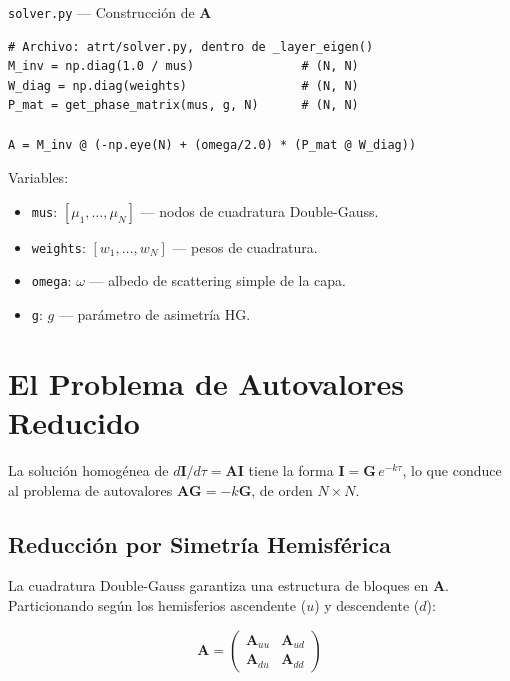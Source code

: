 \documentclass[a4paper,11pt]{article}
\begin{document}
\begin{implementation}{\texttt{solver.py} --- Construcci\'on de $\mathbf{A}$}
\begin{lstlisting}
# Archivo: atrt/solver.py, dentro de _layer_eigen()
M_inv = np.diag(1.0 / mus)               # (N, N)
W_diag = np.diag(weights)                # (N, N)
P_mat = get_phase_matrix(mus, g, N)      # (N, N)

A = M_inv @ (-np.eye(N) + (omega/2.0) * (P_mat @ W_diag))
\end{lstlisting}
Variables:
\begin{itemize}
\item \texttt{mus}: $[\mu_1, \ldots, \mu_N]$ --- nodos de cuadratura Double-Gauss.
\item \texttt{weights}: $[w_1, \ldots, w_N]$ --- pesos de cuadratura.
\item \texttt{omega}: $\omega$ --- albedo de scattering simple de la capa.
\item \texttt{g}: $g$ --- par\'ametro de asimetr\'ia HG.
\end{itemize}
\end{implementation}

\section{El Problema de Autovalores Reducido}
\label{sec:eigenvalue}

La soluci\'on homog\'enea de $d\mathbf{I}/d\tau = \mathbf{A}\mathbf{I}$ tiene la forma $\mathbf{I} = \mathbf{G} \, e^{-k\tau}$, lo que conduce al problema de autovalores $\mathbf{A}\mathbf{G} = -k\mathbf{G}$, de orden $N \times N$.

\subsection{Reducci\'on por Simetr\'ia Hemisf\'erica}

La cuadratura Double-Gauss garantiza una estructura de bloques en $\mathbf{A}$. Particionando seg\'un los hemisferios ascendente ($u$) y descendente ($d$):

\begin{equation}
\mathbf{A} = \begin{pmatrix} \mathbf{A}_{uu} & \mathbf{A}_{ud} \\ \mathbf{A}_{du} & \mathbf{A}_{dd} \end{pmatrix}
\end{equation}
\end{document}

